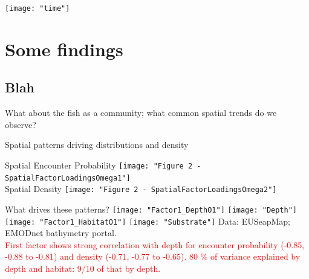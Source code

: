 \documentclass[xcolor=x11names,compress]{beamer}
\renewcommand{\(}{\begin{columns}}
\renewcommand{\)}{\end{columns}}
\newcommand{\<}[1]{\begin{column}{#1}}
\renewcommand{\>}{\end{column}}
\begin{document}
\begin{frame}
\centering
\texttt{[image: "time"]}

\end{frame}

\section{Some findings}
\subsection{Blah}

\begin{frame}
\end{frame}


\begin{frame}
	What about the fish as a community; what common spatial trends do we observe?
\end{frame}


\begin{frame}{Spatial patterns driving distributions and density}

\centering
\tiny
Spatial Encounter Probability
\texttt{[image: "Figure 2 - SpatialFactorLoadingsOmega1"]}
\\
Spatial Density
\texttt{[image: "Figure 2 - SpatialFactorLoadingsOmega2"]}
	
\end{frame}

\begin{frame}{What drives these patterns?}
\centering
\pause
\texttt{[image: "Factor1\_DepthO1"]}
\texttt{[image: "Depth"]} \\
\pause
\texttt{[image: "Factor1\_HabitatO1"]}
\texttt{[image: "Substrate"]}
\tiny
\hspace{2cm} Data: EUSeapMap; EMODnet bathymetry portal. \\
\pause
\tiny
\textcolor{red}{First factor shows strong correlation with depth for encounter probability
(-0.85, -0.88 to -0.81) and density (-0.71, -0.77 to -0.65). 80 \% of variance
explained by depth and habitat: 9/10 of that by depth.}

\end{frame}
\end{document}
